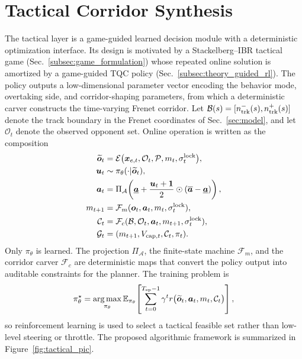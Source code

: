 \documentclass{iopjournal}
\begin{document}
\section{Tactical Corridor Synthesis}\label{sec:tactical}
The tactical layer is a game-guided learned decision module with a
deterministic optimization interface.  Its design is motivated by a
Stackelberg--IBR tactical game
(Sec.~\ref{subsec:game_formulation}) whose repeated online solution is
amortized by a game-guided TQC policy
(Sec.~\ref{subsec:theory_guided_rl}).  The policy outputs a
low-dimensional parameter vector encoding the behavior mode, overtaking side,
and corridor-shaping parameters, from which a deterministic carver constructs
the time-varying Frenet corridor.
Let $\mathcal{B}(s)=[n_{\rm trk}^-(s),n_{\rm trk}^+(s)]$
denote the track boundary in the Frenet coordinates of Sec.~\ref{sec:model},
and let $\mathcal{O}_t$ denote the observed opponent set.  Online operation is
written as the composition
\begin{equation}
\begin{aligned}
\widetilde{\bm{o}}_t
&=\mathcal{E}\bigl(\bm{x}_{e,t},\mathcal{O}_t,\mathcal{P},
m_t,\sigma_t^{\rm lock}\bigr),\\
\bm{u}_t&\sim\pi_\theta(\cdot|\widetilde{\bm{o}}_t),\\
\bm{a}_t&=\Pi_{\mathcal{A}}\!\left(
\underline{\bm{a}}+\frac{\bm{u}_t+\bm{1}}{2}\odot
(\overline{\bm{a}}-\underline{\bm{a}})\right),\\
m_{t+1}&=\mathcal{F}_{m}(\bm{o}_t,\bm{a}_t,m_t,\sigma_t^{\rm lock}),\\
\mathcal{C}_t&=\mathcal{F}_{c}(\mathcal{B},\mathcal{O}_t,\bm{a}_t,
m_{t+1},\sigma_t^{\rm lock}),\\
\mathcal{G}_t&=(m_{t+1},V_{{\rm cap},t},\mathcal{C}_t,\pi_t).
\end{aligned}
\label{eq:tactical_stack}
\end{equation}
Only $\pi_\theta$ is learned.  The projection $\Pi_{\mathcal A}$, the
finite-state machine $\mathcal{F}_m$, and the corridor carver
$\mathcal{F}_c$ are deterministic maps that convert the policy output into
auditable constraints for the planner.  The training problem is
\begin{equation}
\pi_\theta^\star=
\operatorname*{arg\,max}_{\pi_\theta}
\mathbb{E}_{\pi_\theta}\!
\left[
\sum_{t=0}^{T_{\rm ep}-1}\gamma^t
r\bigl(\widetilde{\bm{o}}_t,\bm{a}_t,m_t,\mathcal{C}_t\bigr)
\right],
\label{eq:tactical_objective}
\end{equation}
so reinforcement learning is used to select a tactical feasible set rather
than low-level steering or throttle.
The proposed algorithmic framework is summarized in Figure~\ref{fig:tactical_pic}.
\end{document}
